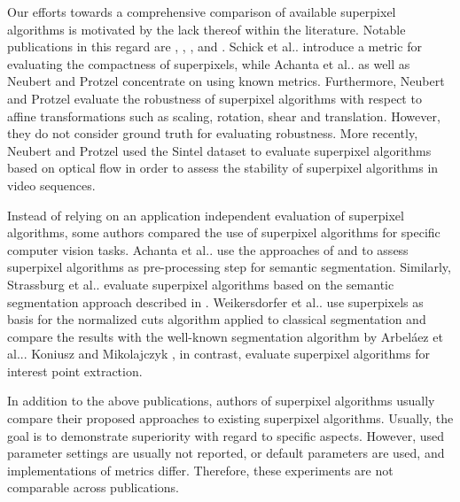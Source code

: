 \documentclass[5p]{elsarticle}
\makeatletter
\DeclareRobustCommand\onedot{\futurelet\@let@token\@onedot}
\def\@onedot{\ifx\@let@token.\else.\null\fi\xspace}
\def\etal{{et al}\onedot}
\makeatother
\begin{document}
Our efforts towards a comprehensive comparison of available superpixel algorithms
is motivated by the lack thereof within the literature.
Notable publications in this regard are \cite{SchickFischerStiefelhagen:2012},
\cite{AchantaShajiSmithLucchiFuaSuesstrunk:2012}, \cite{NeubertProtzel:2012}, and \cite{NeubertProtzel:2013}.
Schick \etal \cite{SchickFischerStiefelhagen:2012} introduce a metric for evaluating
the compactness of superpixels, while Achanta \etal \cite{AchantaShajiSmithLucchiFuaSuesstrunk:2012}
as well as Neubert and Protzel \cite{NeubertProtzel:2012} concentrate on using
known metrics. Furthermore, Neubert and Protzel evaluate the robustness of superpixel
algorithms with respect to affine transformations such as scaling, rotation, shear
and translation. However, they do not consider ground truth for evaluating robustness.
More recently, Neubert and Protzel \cite{NeubertProtzel:2013} used the Sintel dataset
\cite{ButlerWulffStanleyBlack:2012} to evaluate superpixel algorithms based on optical
flow in order to assess the stability of superpixel algorithms in video sequences.

Instead of relying on an application independent evaluation of superpixel algorithms, some authors
compared the use of superpixel algorithms for specific computer vision tasks.
Achanta \etal \cite{AchantaShajiSmithLucchiFuaSuesstrunk:2012} use
the approaches of \cite{GouldRodgersCohenElidanKoller:2008} and \cite{GonfausBoschVanDeWeijerBagdanovSerratGonzalez:2010}
to assess superpixel algorithms as pre-processing step for semantic segmentation.
Similarly, Strassburg \etal \cite{StrassburgGrzeszickRothackerFink:2015} evaluate
superpixel algorithms based on the semantic segmentation approach described in \cite{TigheLazebnik:2010}.
Weikersdorfer \etal \cite{WeikersdorferGossowBeetz:2012} use superpixels as basis for the normalized cuts
algorithm \cite{ShiMalik:2000} applied to classical segmentation and compare the
results with the well-known segmentation algorithm by Arbel{\'a}ez \etal \cite{ArbelaezMaireFowlkesMalik:2011}.
Koniusz and Mikolajczyk \cite{KoniuszMikolajczyk:2009}, in contrast, evaluate superpixel algorithms
for interest point extraction.

In addition to the above publications, authors of superpixel algorithms usually
compare their proposed approaches to existing superpixel algorithms. Usually, the
goal is to demonstrate superiority with regard to specific aspects. However, used
parameter settings are usually not reported, or default parameters are used, and
implementations of metrics differ. Therefore, these experiments are
not comparable across publications.
\end{document}
